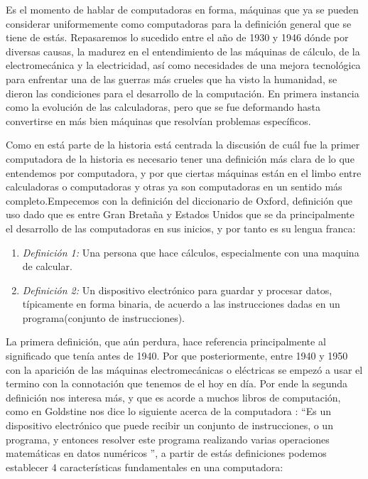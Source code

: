 \documentclass[letterpaper,12pt,oneside]{book}
\begin{document}
		Es el momento de hablar de computadoras en forma, máquinas que ya se pueden considerar uniformemente como computadoras para la definición general
		que se tiene de estás. Repasaremos lo sucedido entre el año de 1930 y 1946 dónde por diversas causas, la madurez en el entendimiento de las
		máquinas de cálculo, de la electromecánica y la electricidad, así como necesidades de una mejora tecnológica para enfrentar una de las guerras
		más crueles que ha visto la humanidad, se dieron las condiciones para el desarrollo de la computación. En primera instancia
		como la evolución de las calculadoras, pero que se fue deformando hasta convertirse en más bien máquinas que resolvían problemas específicos.
		
		Como en está parte de la historia está centrada la discusión de cuál fue la primer computadora de la historia es necesario tener una definición
		más clara de lo que entendemos por computadora, y por que ciertas máquinas están en el limbo entre calculadoras o computadoras y otras
		ya son computadoras en un sentido más completo.Empecemos con la definición 
		del diccionario de Oxford, definición que uso dado que es entre Gran Bretaña y Estados Unidos que se da principalmente el desarrollo de las computadoras
		en sus inicios, y por tanto es su lengua franca:
		\begin{enumerate}
			  \item[] \emph{ Definición 1:} Una persona que hace cálculos, especialmente con una maquina de calcular.
			  \item[] \emph{ Definición 2:} Un dispositivo electrónico para guardar y procesar datos, típicamente en forma binaria, de acuerdo a las instrucciones
			  dadas en un programa(conjunto de instrucciones).
		\end{enumerate}
		
		La primera definición, que aún perdura, hace referencia principalmente al significado que tenía antes de 1940. Por que posteriormente, entre 1940 y 1950
		con la aparición de las máquinas electromecánicas o eléctricas se empezó a usar el termino con la connotación que tenemos de el hoy en día. Por ende
		la segunda definición nos interesa más, y que es acorde a muchos libros de computación, como  en \cite{goldstine_computer_1972} Goldstine nos dice lo siguiente 
		acerca de la computadora : ``Es un dispositivo electrónico que puede recibir un conjunto de instrucciones, o un programa,
		y entonces resolver este programa realizando varias operaciones matemáticas en datos numéricos '', a partir de estás definiciones podemos establecer
		4 características fundamentales en una computadora:
		
\end{document}
